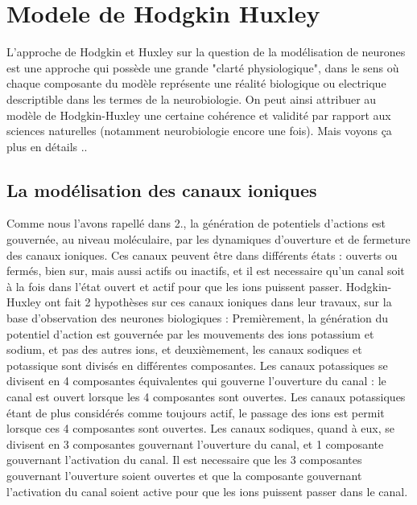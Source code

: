 \documentclass[12pt]{scrartcl}
\begin{document}
\section{Modele de Hodgkin Huxley}
	L'approche de Hodgkin et Huxley sur la question de la modélisation de neurones est une approche qui possède une grande "clarté physiologique", dans le sens où chaque composante du modèle représente une réalité biologique ou electrique descriptible dans les termes de la neurobiologie. On peut ainsi attribuer au modèle de Hodgkin-Huxley une certaine cohérence et validité par rapport aux sciences naturelles (notamment neurobiologie encore une fois). Mais voyons ça plus en détails ..
	
	\subsection{La modélisation des canaux ioniques}
		Comme nous l'avons rapellé dans 2., la génération de potentiels d'actions est gouvernée, au niveau moléculaire, par les dynamiques d'ouverture et de fermeture des canaux ioniques. Ces canaux peuvent être dans différents états : ouverts ou fermés, bien sur, mais aussi actifs ou inactifs, et il est necessaire qu'un canal soit à la fois dans l'état ouvert et actif pour que les ions puissent passer. Hodgkin-Huxley ont fait 2 hypothèses sur ces canaux ioniques dans leur travaux, sur la base d'observation des neurones biologiques : Premièrement, la génération du potentiel d'action est gouvernée par les mouvements des ions potassium et sodium, et pas des autres ions, et deuxièmement, les canaux sodiques et potassique sont divisés en différentes composantes. Les canaux potassiques se divisent en 4 composantes équivalentes qui gouverne l'ouverture du canal : le canal est ouvert lorsque les 4 composantes sont ouvertes. Les canaux potassiques étant de plus considérés comme toujours actif, le passage des ions est permit lorsque ces 4 composantes sont ouvertes. Les canaux sodiques, quand à eux, se divisent en 3 composantes gouvernant l'ouverture du canal, et 1 composante gouvernant l'activation du canal. Il est necessaire que les 3 composantes gouvernant l'ouverture soient ouvertes et que la composante gouvernant l'activation du canal soient active pour que les ions puissent passer dans le canal.
\end{document}
